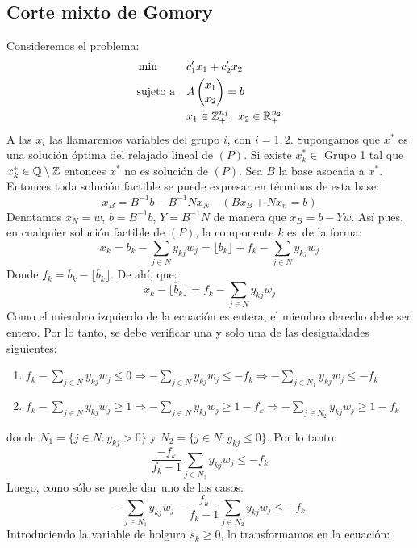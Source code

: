 \documentclass[PM.tex]{subfiles}
\begin{document}
\subsection{Corte mixto de Gomory}

Consideremos el problema:
\[
\begin{aligned}
& \min
& & c_1'x_1+c_2'x_2 \\
& \text{sujeto a}
& & A \begin{pmatrix}x_1\\x_2\end{pmatrix} = b\\
& & & x_1 \in \mathbb{Z}_+^{n_1},\ x_2 \in \mathbb{R}_+^{n_2}
\end{aligned}
\]
A las $x_i$ las llamaremos variables del grupo $i$, con $i=1,2$. Supongamos que $x^*$ es una solución óptima del relajado lineal de $(P)$. Si existe $x_k^* \in$ Grupo 1 tal que $x_k^* \in \mathbb{Q} \setminus \mathbb{Z}$ entonces $x^*$ no es solución de $(P)$.  Sea $B$ la base asocada a $x^*$. Entonces toda solución factible se puede expresar en términos de esta base:
\[ x_B = B^{-1}b - B^{-1} N x_N \quad (Bx_B + Nx_n = b) \]
Denotamos $x_N = w$, $\overline{b} = B^{-1}b$, $Y = B^{-1}N$ de manera que $x_B = \overline{b} - Y w$. Así pues, en cualquier solución factible de $(P)$, la componente $k$ es\ de la forma:
\[ x_k = \overline{b}_k - \sum_{j \in N} y_{kj}w_j = \lfloor \overline{b}_k \rfloor + f_k - \sum_{j \in N} y_{kj}w_j \]
Donde $f_k = \overline{b}_k-\lfloor \overline{b}_k \rfloor$. De ahí, que:
\[ x_k - \lfloor \overline{b}_k \rfloor = f_k - \sum_{j \in N} y_{kj}w_j \]
Como el miembro izquierdo de la ecuación es entera, el miembro derecho debe ser entero. Por lo tanto, se debe verificar una y solo una de las desigualdades siguientes:
\begin{enumerate}
	\item $f_k - \sum\limits_{j \in N} y_{kj} w_j ≤ 0 \Rightarrow - \sum\limits_{j \in N} y_{kj} w_j ≤ -f_k \Rightarrow - \sum\limits_{j \in N_1} y_{kj} w_j ≤ -f_k$
	\item $f_k - \sum\limits_{j \in N} y_{kj} w_j ≥ 1 \Rightarrow - \sum\limits_{j \in N} y_{kj} w_j ≥ 1-f_k \Rightarrow - \sum\limits_{j \in N_2} y_{kj} w_j ≥ 1-f_k$
\end{enumerate}
donde $N_1 = \{j \in N : y_{kj} > 0\}$ y $N_2 = \{j \in N : y_{kj} ≤ 0\}$. Por lo tanto:
\[ \frac{-f_k}{f_k-1} \sum_{j \in N_2} y_{kj} w_j ≤ -f_k \]
Luego, como sólo se puede dar uno de los casos:
\[ -\sum_{j \in N_1} y_{kj} w_j - \frac{f_k}{f_k -1} \sum_{j \in N_2} y_{kj} w_j ≤ -f_k \]
Introduciendo la variable de holgura $s_k ≥ 0$, lo transformamos en la ecuación:
\end{document}
